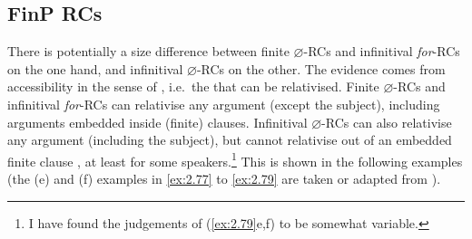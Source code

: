 \documentclass[output=paper]{langsci/langscibook}
\begin{document}
\subsection{FinP RCs}\largerpage

There is potentially a size difference between finite $\varnothing$-\glspl{RC}
and infinitival \emph{for}-\glspl{RC} on the one hand, and infinitival
$\varnothing$-\glspl{RC} on the other. The evidence comes from accessibility in
the sense of \textcite{KeenanComrie1977}, i.e.\ the  that
can be relativised. Finite $\varnothing$-\glspl{RC} and infinitival
\emph{for}-\glspl{RC} can relativise any argument (except the subject),
including arguments embedded inside (finite) clauses. Infinitival
$\varnothing$-\glspl{RC} can also relativise any argument (including the
subject), but cannot relativise out of an embedded finite clause
\citep{Longenbaugh2016}, at least for some speakers.\footnote{I have found the
judgements of (\ref{ex:2.79}e,f) to be somewhat variable.} This is shown in the following
examples (the (e) and (f) examples in \eqref{ex:2.77} to
\eqref{ex:2.79} are taken or adapted from
\citealt{Longenbaugh2016}).
\end{document}
